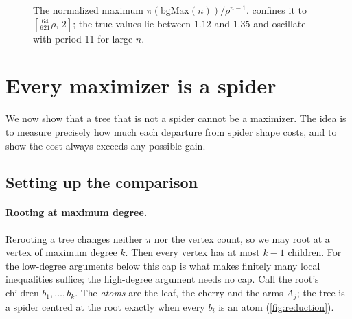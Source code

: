 \documentclass[11pt]{article}
\theoremstyle{definition}
\begin{document}
\begin{figure}[htbp]\centering
{}
\caption{The normalized maximum $\pi(\mathrm{bgMax}(n))/\rho^{n-1}$.  confines it to
$[\tfrac{64}{621}\rho,\,2]$; the true values lie between $1.12$ and $1.35$ and oscillate with period 11
for large $n$.}
\label{fig:ratio}
\end{figure}

\section{Every maximizer is a spider}\label{sec:reduction}

We now show that a tree that is not a spider cannot be a maximizer. The idea is to measure precisely
how much each departure from spider shape costs, and to show the cost always exceeds any possible gain.

\subsection{Setting up the comparison}

\paragraph{Rooting at maximum degree.} Rerooting a tree changes neither $\pi$ nor the vertex count, so
we may root at a vertex of maximum degree $k$. Then every vertex has at most $k-1$ children. For the low-degree
arguments below this cap is what makes finitely many local inequalities suffice; the high-degree argument
needs no cap. Call the root's children
$b_1,\dots,b_k$. The \emph{atoms} are the leaf, the cherry and the arms $A_j$; the tree is a spider
centred at the root exactly when every $b_i$ is an atom (\cref{fig:reduction}).
\end{document}
